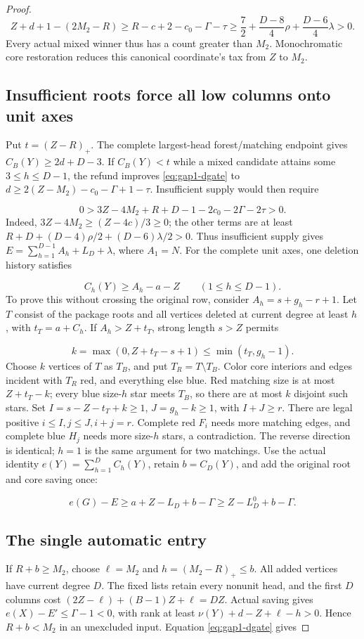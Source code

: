 \documentclass[11pt,a4paper]{article}
\theoremstyle{definition}
\begin{document}
\begin{proof}
\[
Z+d+1-(2M_2-R)\ge R-c+2-c_0-\Gamma-\tau
\ge\frac72+\frac{D-8}{4}\rho+\frac{D-6}{4}\lambda>0.
\]
Every actual mixed winner thus has a count greater than $M_2$.
Monochromatic core restoration reduces this canonical coordinate's tax from $Z$ to $M_2$.
\subsection*{Insufficient roots force all low columns onto unit axes}
Put $t=(Z-R)_+$. The complete largest-head forest/matching endpoint gives
$C_B(Y)\ge2d+D-3$.
If $C_B(Y)<t$ while a mixed candidate attains some $3\le h\le D-1$,
the refund improves \eqref{eq:gap1-dgate} to
$d\ge2(Z-M_2)-c_0-\Gamma+1-\tau$.
Insufficient supply would then require

\[
0>3Z-4M_2+R+D-1-2c_0-2\Gamma-2\tau>0.
\]
Indeed, $3Z-4M_2\ge(Z-4c)/3\ge0$; the other terms are at least
$R+D+(D-4)\rho/2+(D-6)\lambda/2>0$.
Thus insufficient supply gives
$E=\sum_{h=1}^{D-1}A_h+L_D+\lambda$, where $A_1=N$.
For the complete unit axes, one deletion history satisfies

\begin{equation}\label{eq:unit-history}
C_h(Y)\ge A_h-a-Z\qquad(1\le h\le D-1).
\end{equation}
To prove this without crossing the original row, consider $A_h=s+g_h-r+1$.
Let $T$ consist of the package roots and all vertices deleted at current degree
at least $h$, with $t_T=a+C_h$.
If $A_h>Z+t_T$, strong length $s>Z$ permits

\[
k=\max(0,Z+t_T-s+1)\le\min(t_T,g_h-1).
\]
Choose $k$ vertices of $T$ as $T_B$, and put $T_R=T\setminus T_B$.
Color core interiors and edges incident with $T_R$ red, and everything else blue.
Red matching size is at most $Z+t_T-k$; every blue size-$h$ star meets $T_B$,
so there are at most $k$ disjoint such stars.
Set $I=s-Z-t_T+k\ge1$, $J=g_h-k\ge1$, with $I+J\ge r$.
There are legal positive $i\le I,j\le J,i+j=r$.
Complete red $F_i$ needs more matching edges, and complete blue $H_j$
needs more size-$h$ stars, a contradiction.
The reverse direction is identical; $h=1$ is the same argument for two matchings.
Use the actual identity $e(Y)=\sum_{h=1}^D C_h(Y)$, retain $b=C_D(Y)$,
and add the original root and core saving once:

\begin{equation}\label{eq:unit-area}
e(G)-E\ge a+Z-L_D+b-\Gamma\ge Z-L_D^0+b-\Gamma.
\end{equation}
\subsection*{The single automatic entry}
If $R+b\ge M_2$, choose $\ell=M_2$ and $h=(M_2-R)_+\le b$.
All added vertices have current degree $D$.
The fixed lists retain every nonunit head,
and the first $D$ columns cost $(2Z-\ell)+(B-1)Z+\ell=DZ$.
Actual saving gives $e(X)-E'\le\Gamma-1<0$, with rank at least
$\nu(Y)+d-Z+\ell-h>0$. Hence $R+b<M_2$ in an unexcluded input.
Equation \eqref{eq:gap1-dgate} gives


\end{proof}
\end{document}
